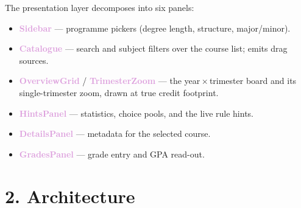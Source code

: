 \documentclass[11pt,a4paper]{article}
\newcommand{\comp}[1]{\textcolor{plum}{\textbf{#1}}}
\begin{document}
\vspace{0.4cm}
\noindent The presentation layer decomposes into six panels:

\begin{itemize}[leftmargin=1.3em,itemsep=2pt]
  \item \comp{Sidebar} --- programme pickers (degree length, structure, major/minor).
  \item \comp{Catalogue} --- search and subject filters over the course list; emits drag sources.
  \item \comp{OverviewGrid} / \comp{TrimesterZoom} --- the year\,$\times$\,trimester board and its single-trimester zoom, drawn at true credit footprint.
  \item \comp{HintsPanel} --- statistics, choice pools, and the live rule hints.
  \item \comp{DetailsPanel} --- metadata for the selected course.
  \item \comp{GradesPanel} --- grade entry and GPA read-out.
\end{itemize}

\clearpage
\section*{2. Architecture}
\end{document}
